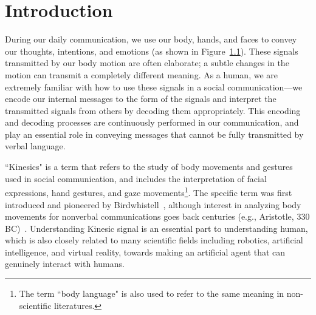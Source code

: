 
%
%	

\chapter{Introduction}
\label{sec:introduction}
\begin{figure}[h]
	 	
	\label{fig:intro}
\end{figure}

During our daily communication, we use our body, hands, and faces to convey our thoughts, intentions, and emotions (as shown in Figure~\ref{fig:intro}). These signals transmitted by our body motion are often elaborate; a subtle changes in the motion can transmit a completely different meaning. As a human, we are extremely familiar with how to use these signals in a social communication---we encode our internal messages to the form of the signals and interpret the transmitted signals from others by decoding them appropriately. This encoding and decoding processes are continuously performed in our communication, and play an essential role in conveying messages that cannot be fully transmitted by verbal language.  

``Kinesics" is a term that refers to the study of body movements and gestures used in social communication, and includes the interpretation of facial expressions, hand gestures, and gaze movements\footnote{The term ``body language" is also used to refer to the same meaning in non-scientific literatures.}. The specific term was first introduced and pioneered by Birdwhistell~\cite{Birdwhistell52,Birdwhistell-1970}, although interest in analyzing body movements for nonverbal communications goes back centuries (e.g., Aristotle, 330 BC)~\cite{dael2015measuring}. Understanding Kinesic signal is an essential part to understanding human, which is also closely related to many scientific fields including robotics, artificial intelligence, and virtual reality, towards making an artificial agent that can genuinely interact with humans. 

